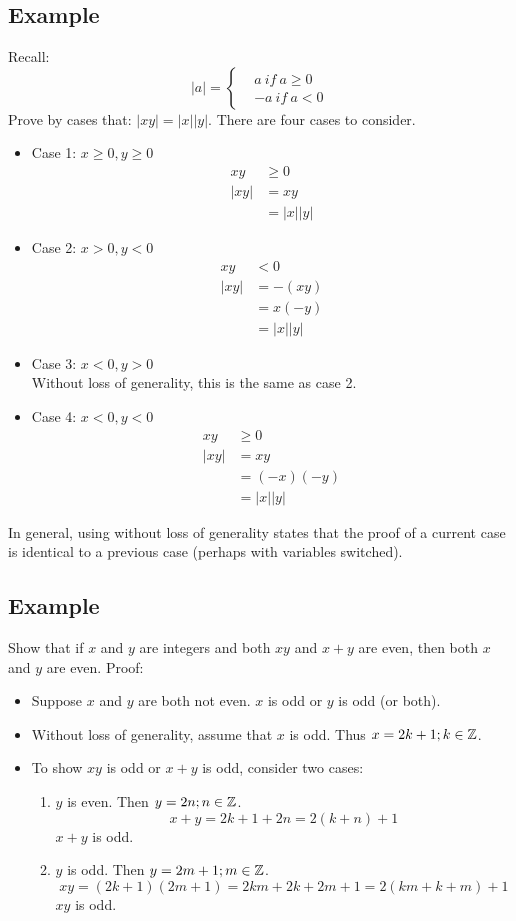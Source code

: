 \documentclass[letterpaper, 12pt]{math}
\begin{document}
\subsection*{Example}
Recall:
\[ |a| =
  \begin{cases}
    & a\ if\ a \geq 0 \\
    &-a\ if\ a < 0
  \end{cases}
\]
Prove by cases that: \( |xy| = |x||y| \). There are four cases to consider.
\begin{itemize}
  \item Case 1: \( x \geq 0, y \geq 0 \)
    \begin{align*}
      xy &\geq 0 \\
      |xy| &= xy \\
      &= |x||y|
    \end{align*}
  \item Case 2: \( x > 0, y < 0 \)
    \begin{align*}
      xy &< 0 \\
      |xy| &= -(xy) \\
      &= x(-y) \\
      &= |x||y|
    \end{align*}
  \item Case 3: \( x < 0, y > 0 \) \\
    Without loss of generality, this is the same as case 2.
  \item Case 4: \( x < 0, y < 0 \)
    \begin{align*}
      xy &\geq 0 \\
      |xy| &= xy \\
      &= (-x)(-y) \\
      &= |x||y|
    \end{align*}
\end{itemize}
In general, using without loss of generality states that the proof of a current
case is identical to a previous case (perhaps with variables switched).

\subsection*{Example}
Show that if \( x \) and \( y \) are integers and both \( xy \) and \( x+y \)
are even, then both \( x \) and \( y \) are even. Proof:
\begin{itemize}
  \item Suppose \( x \) and \( y \) are both not even. \( x \) is odd or \( y \)
    is odd (or both).
  \item Without loss of generality, assume that \( x \) is odd. Thus
    \( x = 2k+1; k\in\mathbb{Z} \).
  \item To show \( xy \) is odd or \( x+y \) is odd, consider two cases:
    \begin{enumerate}
      \item \( y \) is even. Then \( y = 2n; n\in\mathbb{Z} \).
      \[ x+y = 2k+1+2n = 2(k+n)+1 \]
      \( x+y \) is odd.
      \item \( y \) is odd. Then \( y = 2m+1; m\in\mathbb{Z} \).
      \[ xy = (2k+1)(2m+1) = 2km+2k+2m+1 = 2(km+k+m)+1 \]
      \( xy \) is odd.
    \end{enumerate}
\end{itemize}
\end{document}
